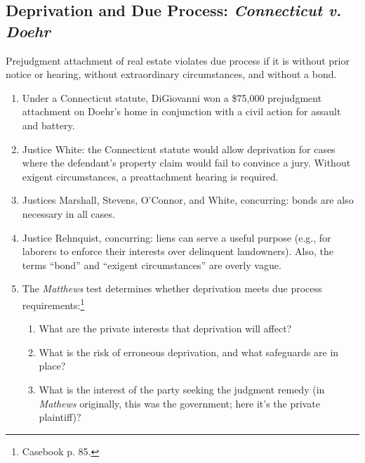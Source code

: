 \subsection{Deprivation and Due Process: \emph{Connecticut v. Doehr}}

Prejudgment attachment of real estate violates due process if it is without 
prior notice or hearing, without extraordinary circumstances, and without a 
bond.

\begin{enumerate}
    \item  Under a Connecticut statute, DiGiovanni won a \$75,000 prejudgment 
    attachment on Doehr's home in conjunction with a civil action for assault 
    and battery.
    \item Justice White: the Connecticut statute would allow deprivation for 
    cases where the defendant's property claim would fail to convince a jury. 
    Without exigent circumstances, a preattachment hearing is required.
    \item Justices Marshall, Stevens, O'Connor, and White, concurring: bonds 
    are also necessary in all cases.
    \item Justice Rehnquist, concurring: liens can serve a useful purpose 
    (e.g., for laborers to enforce their interests over delinquent 
    landowners). Also, the terms ``bond'' and ``exigent circumstances'' are 
    overly vague.
    \item The \emph{Matthews} test determines whether deprivation meets due 
    process requirements:\footnote{Casebook p. 85.}
    \begin{enumerate}
        \item What are the private interests that deprivation will affect?
        \item What is the risk of erroneous deprivation, and what safeguards 
        are in place?
        \item What is the interest of the party seeking the judgment remedy 
        (in \emph{Mathews} originally, this was the government; here it's the 
        private plaintiff)?
    \end{enumerate}
\end{enumerate}
